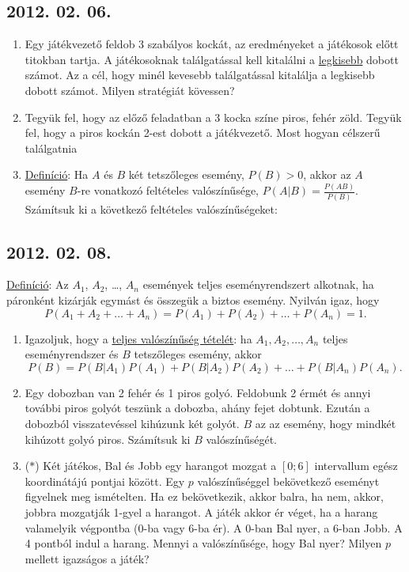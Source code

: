 \subsection*{2012. 02. 06.}
\begin{enumerate}
\item
Egy játékvezető feldob 3 szabályos kockát, az eredményeket a játékosok előtt titokban tartja. A játékosoknak találgatással kell kitalálni a \underline{legkisebb} dobott számot. Az a cél, hogy minél kevesebb találgatással kitalálja a legkisebb dobott számot. Milyen stratégiát kövessen?
\item
Tegyük fel, hogy az előző feladatban a 3 kocka színe piros, fehér zöld. Tegyük fel, hogy a piros kockán 2-est dobott a játékvezető. Most hogyan célszerű találgatnia
\item \underline{Definíció}: Ha $A$ és $B$ két tetszőleges esemény, $P(B)>0$, akkor az $A$ esemény $B$-re vonatkozó feltételes valószínűsége, $P(A|B)=\frac{P(AB)}{P(B)}$.\\
Számítsuk ki a következő feltételes valószínűségeket:
\end{enumerate}

\subsection*{2012. 02. 08.}
\underline{Definíció}: Az $A_{1}$, $A_{2}$, \ldots, $A_{n}$ események  teljes eseményrendszert alkotnak, ha páronként kizárják egymást és összegük a biztos esemény. Nyilván igaz, hogy
$$P(A_{1}+A_{2}+\ldots+A_{n})=P(A_{1})+P(A_{2})+\ldots+P(A_{n}) =1.$$
\begin{enumerate}
\item 
Igazoljuk, hogy a \underline{teljes valószínűség tételét}: ha 
$A_1, A_2, \ldots, A_n$ teljes eseményrendszer és $B$ tetszőleges esemény, akkor
$$P(B)=P(B|A_{1})P(A_{1})+P(B|A_{2})P(A_{2})+\ldots+P(B|A_{n})P(A_{n}).$$
\item Egy dobozban van 2 fehér és 1 piros golyó. Feldobunk 2 érmét és annyi további piros golyót teszünk a dobozba, ahány fejet dobtunk. Ezután a dobozból visszatevéssel kihúzunk két golyót. $B$ az az esemény, hogy mindkét kihúzott golyó piros. Számítsuk ki $B$ valószínűségét.
\item ($*$)
Két játékos, Bal és Jobb egy harangot mozgat a $[0;6]$ intervallum egész koordinátájú pontjai között. Egy $p$ valószínűséggel bekövetkező eseményt figyelnek meg ismételten. Ha ez bekövetkezik, akkor balra, ha nem, akkor, jobbra mozgatják 1-gyel a harangot. A játék akkor ér véget, ha a harang valamelyik végpontba (0-ba vagy 6-ba ér). A 0-ban Bal nyer, a 6-ban Jobb. A 4 pontból indul a  harang. Mennyi a valószínűsége, hogy Bal nyer? Milyen $p$ mellett igazságos a játék?
\end{enumerate}

